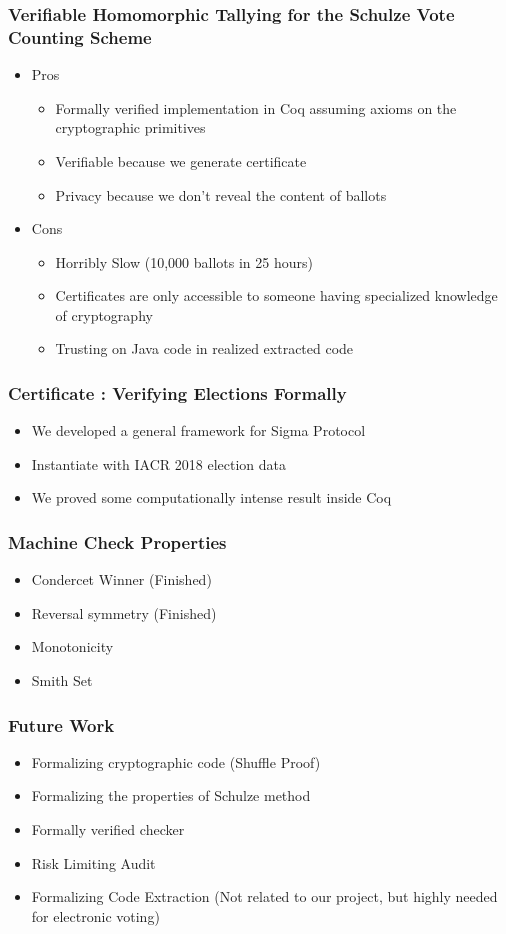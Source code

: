 \documentclass{beamer}
\begin{document}
\begin{frame}
\frametitle{Verifiable Homomorphic Tallying for the Schulze Vote Counting Scheme}
\begin{itemize}[]
\item Pros 
\begin{itemize}
\item Formally verified implementation in Coq assuming axioms on 
          the cryptographic primitives 
\item Verifiable because we generate certificate 
\item Privacy because we don't reveal the content of ballots
\end{itemize}
\item Cons
\begin{itemize}
\item Horribly Slow (10,000 ballots in 25 hours)
\item Certificates are only accessible to someone having specialized 
	  knowledge of cryptography
\item Trusting on Java code in realized extracted code
\end{itemize}
\end{itemize}
\end{frame}


\begin{frame}
\frametitle{Certificate : Verifying Elections Formally}
\begin{itemize}
\item We developed a general framework for Sigma Protocol
\item Instantiate with IACR 2018 election data
\item We proved some computationally intense result inside 
      Coq
\end{itemize}
\end{frame}



\begin{frame}
\frametitle{Machine Check Properties}
\begin{itemize}
\item Condercet Winner (Finished)
\item Reversal symmetry (Finished)
\item Monotonicity
\item Smith Set
\end{itemize}
\end{frame}

\begin{frame}
\frametitle{Future Work}
\begin{itemize}
\item Formalizing cryptographic code (Shuffle Proof)
\item Formalizing the properties of Schulze method
\item Formally verified checker 
\item Risk Limiting Audit 
\item Formalizing Code Extraction (Not related to our project, but highly needed for electronic voting)
\end{itemize}
\end{frame}
\end{document}
